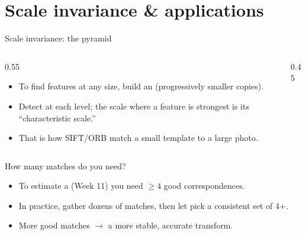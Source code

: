 \documentclass[10pt,aspectratio=169]{beamer}
\begin{document}
\section{Scale invariance \& applications}

\begin{frame}{Scale invariance: the pyramid}
  \begin{columns}[T]
    \begin{column}{0.55\textwidth}
      \begin{itemize}
        \item To find features at any size, build an  (progressively smaller copies).
        \item Detect at each level; the scale where a feature is strongest is its ``characteristic scale.''
        \item That is how SIFT/ORB match a small template to a large photo.
      \end{itemize}
    \end{column}
    \begin{column}{0.45\textwidth}
      \begin{center}
      \end{center}
    \end{column}
  \end{columns}
\end{frame}

\begin{frame}{How many matches do you need?}
  \begin{itemize}
    \item To estimate a  (Week 11) you need $\geq 4$ good correspondences.
    \item In practice, gather dozens of matches, then let  pick a consistent set of 4+.
    \item More good matches $\rightarrow$ a more stable, accurate transform.
  \end{itemize}
\end{frame}
\end{document}
